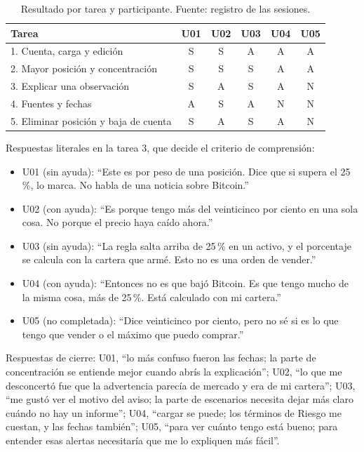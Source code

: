 \begin{table}[ht]
\centering\small\renewcommand{\arraystretch}{1.15}
\caption{Resultado por tarea y participante. Fuente: registro de las sesiones.}\label{tab:sesiones-matriz}
\begin{tabular}{lccccc}\hline
\textbf{Tarea} & \textbf{U01} & \textbf{U02} & \textbf{U03} & \textbf{U04} & \textbf{U05}\\\hline
1. Cuenta, carga y edición & S & S & A & A & A\\
2. Mayor posición y concentración & S & S & S & A & A\\
3. Explicar una observación & S & A & S & A & N\\
4. Fuentes y fechas & A & S & A & N & N\\
5. Eliminar posición y baja de cuenta & S & A & S & A & N\\\hline
\end{tabular}
\end{table}

Respuestas literales en la tarea 3, que decide el criterio de comprensión:
\begin{itemize}
\item U01 (sin ayuda): \enquote{Este es por peso de una posición. Dice que si supera el 25\,\%, lo marca. No habla de una noticia sobre Bitcoin.}
\item U02 (con ayuda): \enquote{Es porque tengo más del veinticinco por ciento en una sola cosa. No porque el precio haya caído ahora.}
\item U03 (sin ayuda): \enquote{La regla salta arriba de 25\,\% en un activo, y el porcentaje se calcula con la cartera que armé. Esto no es una orden de vender.}
\item U04 (con ayuda): \enquote{Entonces no es que bajó Bitcoin. Es que tengo mucho de la misma cosa, más de 25\,\%. Está calculado con mi cartera.}
\item U05 (no completada): \enquote{Dice veinticinco por ciento, pero no sé si es lo que tengo que vender o el máximo que puedo comprar.}
\end{itemize}

Respuestas de cierre: U01, \enquote{lo más confuso fueron las fechas; la parte de concentración se entiende mejor cuando abrís la explicación}; U02, \enquote{lo que me desconcertó fue que la advertencia parecía de mercado y era de mi cartera}; U03, \enquote{me gustó ver el motivo del aviso; la parte de escenarios necesita dejar más claro cuándo no hay un informe}; U04, \enquote{cargar se puede; los términos de Riesgo me cuestan, y las fechas también}; U05, \enquote{para ver cuánto tengo está bueno; para entender esas alertas necesitaría que me lo expliquen más fácil}.
